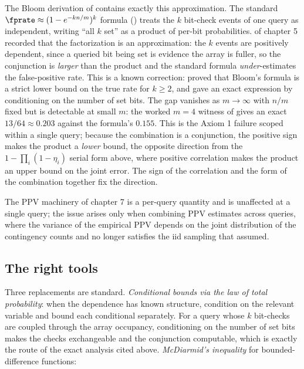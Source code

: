 The Bloom derivation of  contains exactly
this approximation. The standard $\fprate \approx (1 - e^{-kn/m})^k$
formula () treats the $k$ bit-check events of one
query as independent, writing ``all $k$ set'' as a product of per-bit
probabilities.  of chapter 5 recorded that
the factorization is an approximation: the $k$ events are positively
dependent, since a queried bit being set is evidence the array is fuller,
so the conjunction is \emph{larger} than the product and the standard
formula \emph{under}-estimates the false-positive rate. This is a known
correction: \textcite{bose-et-al-2008} proved that Bloom's formula is a
strict lower bound on the true rate for $k \ge 2$, and
\textcite{christensen-roginsky-jimeno-2010} gave an exact expression by
conditioning on the number of set bits. The gap vanishes
as $m \to \infty$ with $n/m$ fixed but is detectable at small $m$: the
worked $m = 4$ witness of  gives an exact
$13/64 \approx 0.203$ against the formula's $0.155$. This is the Axiom 1
failure scoped within a single query; because the combination is a
conjunction, the positive sign makes the product a \emph{lower} bound,
the opposite direction from the $1 - \prod_i (1 - \eta_i)$ serial form
above, where positive correlation makes the product an upper bound on the
joint error. The sign of the correlation and the form of the combination
together fix the direction.

The PPV machinery of chapter 7 is a per-query quantity and is unaffected
at a single query; the issue arises only when combining PPV estimates
across queries, where the variance of the empirical PPV depends on the
joint distribution of the contingency counts and no longer satisfies the
iid sampling that  assumed.

\subsection*{The right tools}

Three replacements are standard. \emph{Conditional bounds via the law of
total probability}: when the dependence has known structure, condition on
the relevant variable and bound each conditional separately. For a query
whose $k$ bit-checks are coupled through the array occupancy, conditioning
on the number of set bits makes the checks exchangeable and the
conjunction computable, which is exactly the route of the exact analysis
cited above. \emph{McDiarmid's inequality} for
bounded-difference functions:

